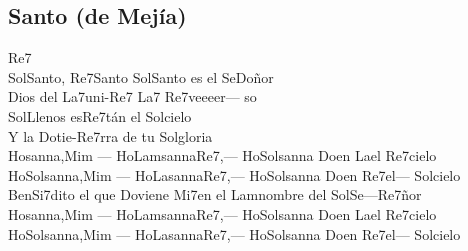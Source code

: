 \subsection{Santo (de Mejía)}
\begin{center}
{\Large
\hspace{-7em}\ac{Re7}\\
\ac{Sol}Santo, \ac{Re7}Santo \ac{Sol}Santo es el Se\ac{Do}ñor\\
Dios del \ac{La7}uni-\ac{Re7 La7 Re7}veeeer--- so\\
\ac{Sol}Llenos es\ac{Re7}tán el \ac{Sol}cielo\\
Y la \ac{Do}tie-\ac{Re7}rra de tu \ac{Sol}gloria\\
Hosanna,\ac{Mim} --- Ho\ac{Lam}sanna\ac{Re7},--- Ho\ac{Sol}sanna \ac{Do}en \ac{La}el \ac{Re7}cielo\\
Ho\ac{Sol}sanna,\ac{Mim} --- Ho\ac{La}sanna\ac{Re7},--- Ho\ac{Sol}sanna \ac{Do}en \ac{Re7}el--- \ac{Sol}cielo\\
Ben\ac{Si7}dito el que \ac{Do}viene \ac{Mi7}en el \ac{Lam}nombre del \ac{Sol}Se---\ac{Re7}ñor\\
Hosanna,\ac{Mim} --- Ho\ac{Lam}sanna\ac{Re7},--- Ho\ac{Sol}sanna \ac{Do}en \ac{La}el \ac{Re7}cielo\\
Ho\ac{Sol}sanna,\ac{Mim} --- Ho\ac{La}sanna\ac{Re7},--- Ho\ac{Sol}sanna \ac{Do}en \ac{Re7}el--- \ac{Sol}cielo\\
}
\end{center}